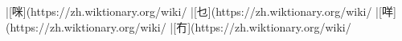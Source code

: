 |[咪](https://zh.wiktionary.org/wiki/%
|[乜](https://zh.wiktionary.org/wiki/%
|[咩](https://zh.wiktionary.org/wiki/%
|[冇](https://zh.wiktionary.org/wiki/%
